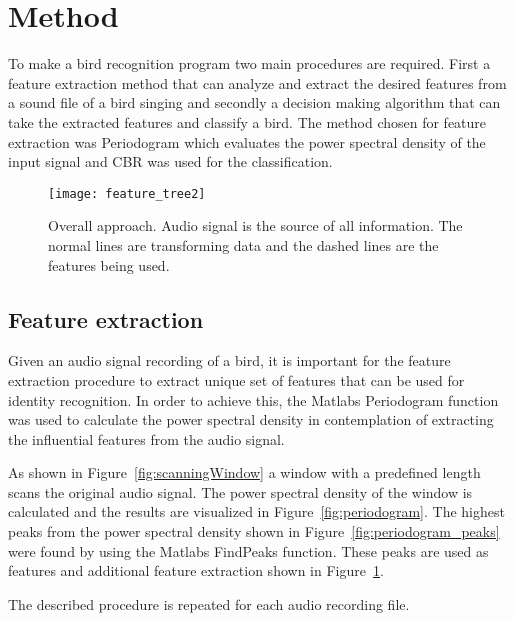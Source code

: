 \section{Method}
To make a bird recognition program two main procedures are required. First a feature
extraction method that can analyze and extract the desired features from a
sound file of a bird singing and secondly a decision making algorithm that can
take the extracted features and classify a bird. The method chosen for  feature
extraction was Periodogram which evaluates the power spectral density of the
input signal and CBR was used for the classification.

\begin{figure}[h]
\centering
\texttt{[image: feature\_tree2]}
\caption{Overall approach. Audio signal is the source of all information. The normal lines are transforming data and the dashed lines are the features being used.}
\label{fig:approach}
\end{figure}

\subsection{Feature extraction}
Given an audio signal recording of a bird, it is important for the feature extraction
procedure to extract unique set of features that can be used for identity recognition.
In order to achieve this, the Matlabs Periodogram function was used to calculate the power
spectral density in contemplation of extracting the influential features from the audio signal.

As shown in Figure~\ref{fig:scanningWindow} a window with a predefined
length scans the original audio signal. The power spectral density of the window
is calculated and the results are visualized in Figure~\ref{fig:periodogram}.
The highest peaks from the power spectral density shown in Figure~\ref{fig:periodogram_peaks} were found
by using the Matlabs FindPeaks function. These peaks are used as features and additional feature extraction shown in Figure~\ref{fig:approach}.

The described procedure is repeated for each audio recording file.

